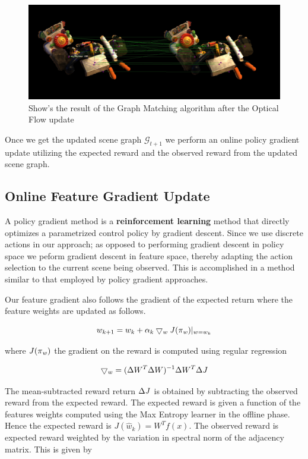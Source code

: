 \begin{figure}[ht!]
	\centering
	\includegraphics[width=\linewidth]{figs/correspondence.jpg}
	\caption{Show's the result of the Graph Matching algorithm after the Optical Flow update}
	\label{fig:correspondence}
\end{figure}


Once we get the updated scene graph $\mathcal{G}_{t+1}$ we perform an online policy gradient update utilizing the expected reward and the observed reward from the updated scene graph.

\subsection{Online Feature Gradient Update}
A policy gradient method is a {\bf reinforcement learning} method that directly optimizes a parametrized control policy by gradient descent. Since we use discrete actions in our approach; as opposed to performing gradient descent in policy space we peform gradient descent in feature space, thereby adapting the action selection to the current scene being observed. This is accomplished in a method similar to that employed by policy gradient approaches.

Our feature gradient also follows the gradient of the expected return where the feature weights are updated as follows.

\[
w_{k+1} = w_k + \alpha_k\bigtriangledown_w{\it J(\pi_w)}|_{w=w_k}\\
\]

where ${\it J(\pi_w)}$ the gradient on the reward is computed using regular regression

\[
\bigtriangledown_w = (\Delta W^T\Delta W)^{-1}\Delta W^T\Delta {\it J}\\
\]

The mean-subtracted reward return $\Delta {\it J}$ is obtained by subtracting the observed reward from the expected reward. The expected reward is given a function of the features weights computed using the Max Entropy learner in the offline phase. Hence the expected reward is $J(\hat{w}_k) = W^Tf(x)$. The observed reward is expected reward weighted by the variation in spectral norm of the adjacency matrix. This is given by

